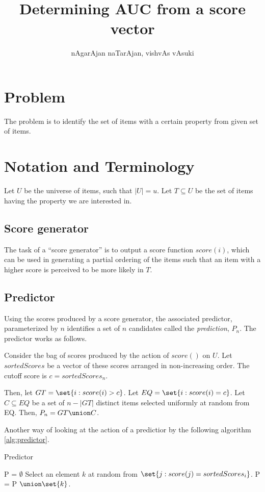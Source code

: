 \documentclass{article}
\title{Determining AUC from a score vector}
\author{nAgarAjan naTarAjan, vishvAs vAsuki}
\begin{document}
\maketitle
\section{Problem}
The problem is to identify the set of items with a certain property from given set of items.

\section{Notation and Terminology}
Let $U$ be the universe of items, such that $|U| = u$. Let $T \subseteq U$ be the set of items having the property we are interested in.

\subsection{Score generator}
The task of a ``score generator'' is to output a score function $score(i)$, which can be used in generating a partial ordering of the items such that an item with a higher score is perceived to be more likely in $T$. 

\subsection{Predictor}
Using the scores produced by a score generator, the associated predictor, parameterized by $n$ identifies a set of $n$ candidates called the \emph{prediction}, $P_n$. The predictor works as follows.

Consider the bag of scores produced by the action of $score()$ on $U$. Let $sortedScores$ be a vector of these scores arranged in non-increasing order. The cutoff score is $c = sortedScores_n$.

Then, let $GT = \set{i: score(i)>c}$. Let $EQ = \set{i: score(i)=c}$. Let $C \subseteq EQ$ be a set of $n - |GT|$ distinct items selected uniformly at random from EQ. Then, $P_n = GT \union C$.

Another way of looking at the action of a predictior by the following algorithm \ref{alg:predictor}.
\begin{algorithm}[h!]
   \caption{Predictor}
   \label{alg:predictor}
\begin{algorithmic}
\STATE P = $\emptyset$
\STATE Select an element $k$ at random from $\set{j : score(j) = sortedScores_i}$.
\STATE P = P $\union \set{k}$.
\ENDFOR
\end{algorithmic}
\end{algorithm}
\end{document}
